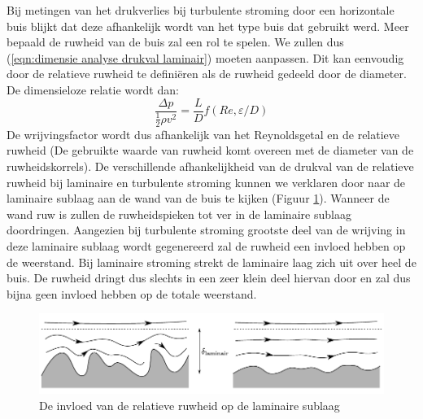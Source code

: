 Bij metingen van het drukverlies bij turbulente stroming door een horizontale buis blijkt dat deze afhankelijk wordt van het type buis dat gebruikt werd. Meer bepaald de ruwheid van de buis zal een rol te spelen. We zullen dus (\ref{eqn:dimensie analyse drukval laminair}) moeten aanpassen. Dit kan eenvoudig door de relatieve ruwheid te definiëren als de ruwheid gedeeld door de diameter. De dimensieloze relatie wordt dan:
\begin{equation}
	\frac{\Delta p}{\frac{1}{2}\rho v^2} = \frac{L}{D} f(Re,\varepsilon/D)
	\label{eqn:dimensie analyse drukval turbulent}
\end{equation}
De wrijvingsfactor wordt dus afhankelijk van het Reynoldsgetal en de relatieve ruwheid (De gebruikte waarde van ruwheid komt overeen met de diameter van de ruwheidskorrels). De verschillende afhankelijkheid van de drukval van de relatieve ruwheid bij laminaire en turbulente stroming kunnen we verklaren door naar de laminaire sublaag aan de wand van de buis te kijken (Figuur \ref{fig:Invloed_ruwheid}). Wanneer de wand ruw is zullen de ruwheidspieken tot ver in de laminaire sublaag doordringen. Aangezien bij turbulente stroming grootste deel van de wrijving in deze laminaire sublaag wordt gegenereerd zal de ruwheid een invloed hebben op de weerstand. Bij laminaire stroming strekt de laminaire laag zich uit over heel de buis. De ruwheid dringt dus slechts in een zeer klein deel hiervan door en zal dus bijna geen invloed hebben op de totale weerstand.
\begin{figure}[htb]
	\centering
	\includegraphics{fig/stroming_in_leidingen/Invloed_ruwheid}
	\caption{De invloed van de relatieve ruwheid op de laminaire sublaag}
	\label{fig:Invloed_ruwheid}
\end{figure}


